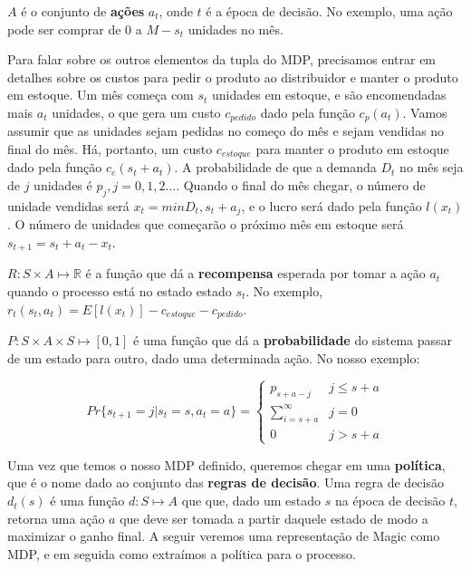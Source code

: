 $A$ é o conjunto de \textbf{ações} $a_t$, onde $t$ é a época de decisão. No exemplo, uma ação
pode ser comprar de $0$ a $M-s_t$ unidades no mês.

Para falar sobre os outros elementos da tupla do MDP, precisamos entrar em detalhes sobre os
custos para pedir o produto ao distribuidor e manter o produto em estoque. Um mês começa com $s_t$
unidades em estoque, e são encomendadas mais $a_t$ unidades, o que gera um custo $c_{pedido}$ dado
pela função $c_p(a_t)$. Vamos assumir que as unidades sejam pedidas no começo do mês e sejam vendidas
no final do mês. Há, portanto, um custo $c_{estoque}$ para manter o produto em estoque dado pela função
$c_e(s_t + a_t)$. A probabilidade de que a demanda $D_t$ no mês seja de $j$ unidades é $p_j, j = 0,1,2\ldots$.
Quando o final do mês chegar, o número de unidade vendidas será $x_t = min{D_t, s_t + a_j}$, e o lucro
será dado pela função $l(x_t)$. O número de unidades que começarão o próximo mês em estoque será
$s_{t+1}= s_t + a_t - x_t$.

$R: S \times A \mapsto \mathbb{R}$ é a função que dá a \textbf{recompensa} esperada por tomar a ação $a_t$
quando o processo está no estado estado $s_t$. No exemplo, $r_t(s_t, a_t) = E[l(x_t)] - c_{estoque} - c_{pedido}$.

$P: S \times A \times S \mapsto [0,1]$ é uma função que dá a \textbf{probabilidade} do sistema passar de um estado
para outro, dado uma determinada ação. No nosso exemplo:

\begin{equation*}
  Pr\{s_{t+1} = j|s_t = s, a_t = a\} = \begin{cases}p_{s+a-j} &j\le s + a \\
                                                    \sum\limits_{i=s+a}^\infty &j=0 \\
                                                    0 & j >s+a\end{cases}
\end{equation*}

Uma vez que temos o nosso MDP definido, queremos chegar em uma \textbf{política}, que é o nome dado
ao conjunto das \textbf{regras de decisão}. Uma regra de decisão $d_t(s)$ é uma função $d: S \mapsto A$
que que, dado um estado $s$ na época de decisão $t$, retorna uma ação $a$ que deve ser tomada a partir
daquele estado de modo a maximizar o ganho final. A seguir veremos uma representação de Magic como MDP,
e em seguida como extraímos a política para o processo.

